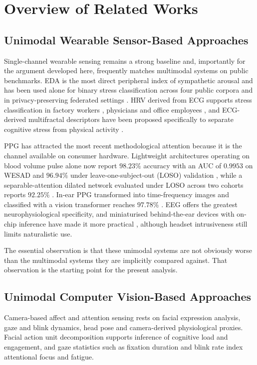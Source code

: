 \section{Overview of Related Works}

\subsection{Unimodal Wearable Sensor-Based Approaches}
Single-channel wearable sensing remains a strong baseline and, importantly for the argument
developed here, frequently matches multimodal systems on public benchmarks. EDA is the most
direct peripheral index of sympathetic arousal and has been used alone for binary stress
classification across four public corpora \cite{r52} and in privacy-preserving federated
settings \cite{r72}. HRV derived from ECG supports stress classification in factory workers
\cite{r5}, physicians \cite{r1} and office employees \cite{r61}, and ECG-derived multifractal
descriptors have been proposed specifically to separate cognitive stress from physical
activity \cite{r56}.

PPG has attracted the most recent methodological attention because it is the channel
available on consumer hardware. Lightweight architectures operating on blood volume pulse
alone now report $98.23\%$ accuracy with an AUC of $0.9953$ on WESAD \cite{r50} and $96.94\%$
under leave-one-subject-out (LOSO) validation \cite{r55}, while a separable-attention dilated
network evaluated under LOSO across two cohorts reports $92.25\%$ \cite{r47}. In-ear PPG
transformed into time-frequency images and classified with a vision transformer reaches
$97.78\%$ \cite{r43}. EEG offers the greatest neurophysiological specificity, and miniaturised
behind-the-ear devices with on-chip inference have made it more practical \cite{r31},
although headset intrusiveness still limits naturalistic use.

The essential observation is that these unimodal systems are not obviously worse than the
multimodal systems they are implicitly compared against. That observation is the starting
point for the present analysis.

\subsection{Unimodal Computer Vision-Based Approaches}
Camera-based affect and attention sensing rests on facial expression analysis, gaze and blink
dynamics, head pose and camera-derived physiological proxies. Facial action unit decomposition
supports inference of cognitive load and engagement, and gaze statistics such as fixation
duration and blink rate index attentional focus and fatigue.

